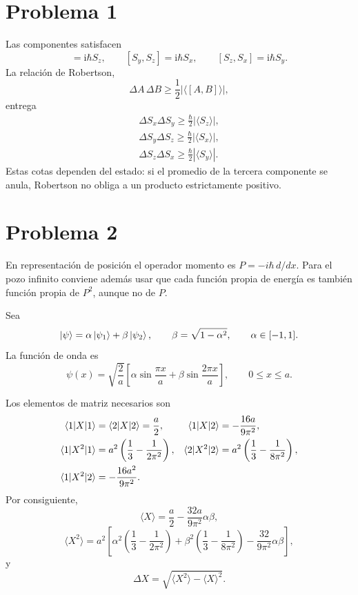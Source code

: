 \documentclass[11pt,a4paper]{article}
\numberwithin{equation}{section}
\renewcommand{\boxed}[1]{#1}
\newcommand{\ii}{\mathrm i}
\newcommand{\hb}{\hbar}
\begin{document}
\section{Problema 1}
Las componentes satisfacen
\begin{equation}
[S_x,S_y]=\ii\hb S_z,
\qquad [S_y,S_z]=\ii\hb S_x,
\qquad [S_z,S_x]=\ii\hb S_y.
\end{equation}
La relación de Robertson,
\begin{equation}
\Delta A\,\Delta B\ge \frac12|\langle[A,B]\rangle|,
\end{equation}
entrega
\begin{align}
\boxed{\Delta S_x\Delta S_y\ge\frac{\hb}{2}|\langle S_z\rangle|,}\\
\boxed{\Delta S_y\Delta S_z\ge\frac{\hb}{2}|\langle S_x\rangle|,}\\
\boxed{\Delta S_z\Delta S_x\ge\frac{\hb}{2}|\langle S_y\rangle|.}
\end{align}
Estas cotas dependen del estado: si el promedio de la tercera componente se anula, Robertson no obliga a un producto estrictamente positivo.

\section{Problema 2}
En representación de posición el operador momento es $P=-i\hbar\,d/dx$. Para el pozo infinito conviene además usar que cada función propia de energía es también función propia de $P^2$, aunque no de $P$.

Sea
\begin{equation}
\ket\psi=\alpha\ket{\psi_1}+\beta\ket{\psi_2},
\qquad \beta=\sqrt{1-\alpha^2},\qquad \alpha\in[-1,1].
\end{equation}
La función de onda es
\begin{equation}
\boxed{\psi(x)=\sqrt{\frac2a}\left[
\alpha\sin\frac{\pi x}{a}+\beta\sin\frac{2\pi x}{a}\right],\qquad0\le x\le a.}
\end{equation}

Los elementos de matriz necesarios son
\begin{align}
\braket{1|X|1}&=\braket{2|X|2}=\frac a2,
&\braket{1|X|2}&=-\frac{16a}{9\pi^2},\\
\braket{1|X^2|1}&=a^2\left(\frac13-\frac1{2\pi^2}\right),
&\braket{2|X^2|2}&=a^2\left(\frac13-\frac1{8\pi^2}\right),\\
\braket{1|X^2|2}&=-\frac{16a^2}{9\pi^2}.
\end{align}
Por consiguiente,
\begin{equation}
\boxed{\langle X\rangle=\frac a2-\frac{32a}{9\pi^2}\alpha\beta,}
\end{equation}
\begin{equation}
\langle X^2\rangle=a^2\left[
\alpha^2\left(\frac13-\frac1{2\pi^2}\right)
+\beta^2\left(\frac13-\frac1{8\pi^2}\right)
-\frac{32}{9\pi^2}\alpha\beta\right],
\end{equation}
y
\begin{equation}
\boxed{\Delta X=\sqrt{\langle X^2\rangle-\langle X\rangle^2}.}
\end{equation}
\end{document}
